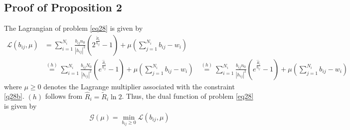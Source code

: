 \documentclass[journal]{IEEEtran}
\begin{document}
\begin{IEEEkeywords}
\section{Proof of Proposition 2}
The Lagrangian of problem \eqref{eq28} is given by
\begin{align}
\mathcal{L}\left(b_{ij}, \mu\right) &=  \sum\limits_{i = 1}^{N_i} \frac{b_{ij}n_0}{\left|h_{ij}\right|^2}\left(2^{\frac{\tilde{R}_i}{b_{ij}}} - 1\right) + \mu\left(\sum_{j = 1}^{N_i}b_{ij} - w_i\right) \nonumber \\ 
& \overset{\left(h\right)}{=} \sum\limits_{i = 1}^{N_i} \frac{b_{ij}N_0}{\left|h_{ij}\right|^2}\left(e^{\frac{\hat{R}_i}{b_{ij}}} - 1\right) + \mu\left(\sum_{j = 1}^{N_i}b_{ij} - w_i\right) 
& \overset{\left(h\right)}{=} \sum\limits_{i = 1}^{N_i} \frac{b_{ij}n_0}{\left|h_{ij}\right|^2}\left(e^{\frac{\hat{R}_i}{b_{ij}}} - 1\right) + \mu\left(\sum_{j = 1}^{N_i}b_{ij} - w_i\right) 
\end{align}
where $\mu \geq 0$ denotes the Lagrange multiplier associated with the constraint \eqref{q28b}. $\left(h\right)$ follows from $\hat{R}_i = \tilde{R}_i \ln2$. Thus, the dual function of problem \eqref{eq28} is given by
\begin{align}
\mathcal{G}\left(\mu\right) = \min_{b_{ij}\geq 0} \mathcal{L}\left(b_{ij},\mu\right)
\end{align}


\end{IEEEkeywords}
\end{document}
